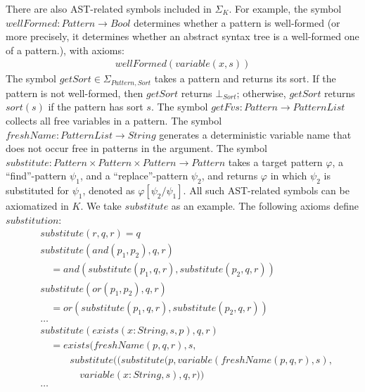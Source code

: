 \documentclass[UTF8]{article}
\theoremstyle{plain}
\theoremstyle{definition}
\theoremstyle{remark}
\newcommand{\cln}{{:}}
\begin{document}
There are also AST-related symbols included in $\Sigma_K$.
For example, the symbol $\mathit{wellFormed} \colon \mathit{Pattern} \to \mathit{Bool}$ determines whether a pattern is well-formed (or more precisely, it determines whether an abstract syntax tree is a well-formed one of a pattern.), with axioms:
\begin{align*}
\mathit{wellFormed}(\mathit{variable}(x, s))
\end{align*}
The symbol $\mathit{getSort} \in \Sigma_{\mathit{Pattern}, \mathit{Sort}}$ takes a pattern and returns its sort. 
If the pattern is not well-formed, then $\mathit{getSort}$ returns $\bot_\mathit{Sort}$; 
otherwise, $\mathit{getSort}$ returns $\mathit{sort}(s)$ if the pattern has sort $s$.
The symbol $\mathit{getFvs} \colon \mathit{Pattern} \to \mathit{PatternList}$ collects all free variables in a pattern.
The symbol $\mathit{freshName} \colon \mathit{PatternList} \to \mathit{String}$ generates a deterministic variable name that does not occur free in patterns in the argument.
The symbol $\mathit{substitute} \colon \mathit{Pattern} \times \mathit{Pattern} \times \mathit{Pattern} \to \mathit{Pattern}$ takes a target pattern $\varphi$, a ``find''-pattern $\psi_1$, and a ``replace''-pattern $\psi_2$, and returns $\varphi$ in which $\psi_2$ is substituted for $\psi_1$, denoted as $\varphi[\psi_2 / \psi_1]$.
All such AST-related symbols can be axiomatized in $K$. 
We take $\mathit{substitute}$ as an example. 
The following axioms define $\mathit{substitution}$:
\begin{align*}
&\mathit{substitute}(r, q, r) = q\\
&\mathit{substitute}(\mathit{and}(p_1, p_2), q, r) \\ 
&\quad = \mathit{and}(\mathit{substitute}(p_1, q, r), \mathit{substitute}(p_2, q, r))\\
&\mathit{substitute}(\mathit{or}(p_1, p_2), q, r) \\
&\quad = \mathit{or}(\mathit{substitute}(p_1, q, r), \mathit{substitute}(p_2, q, r))\\
&\dots\\
&\mathit{substitute}(\mathit{exists}(x\cln\mathit{String}, s, p), q, r)\\
&\quad = \mathit{exists}(\mathit{freshName}(p, q, r), s,\\
&\qquad \quad \mathit{substitute}((\mathit{substitute}(p, variable(\mathit{freshName}(p, q, r), s), \\
&\qquad \quad \quad variable(x\cln\mathit{String}, s), q, r))\\
&\dots
\end{align*}
\end{document}
